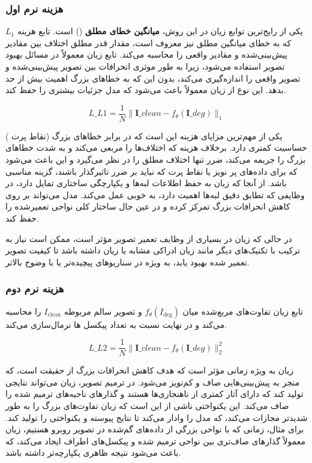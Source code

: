 \subsubsection{هزینه نرم اول}
یکی از رایج‌ترین توابع زیان در این روش، \textbf{میانگین خطای مطلق}
()
است. تابع هزینه $L_1$ که به خطای میانگین مطلق
نیز معروف است، مقدار قدر مطلق اختلاف بین مقادیر پیش‌بینی‌شده و مقادیر واقعی را محاسبه می‌کند. تابع زیان  معمولاً در مسائل بهبود تصویر استفاده می‌شود، زیرا به طور موثری انحرافات بین تصویر پیش‌بینی‌شده و تصویر واقعی را اندازه‌گیری می‌کند، بدون این که به خطاهای بزرگ اهمیت بیش از حد بدهد. این نوع از زیان معمولاً باعث می‌شود که مدل جزئیات بیشتری را حفظ کند.

$$ L\_{L1} = \frac{1}{N} \|\mathbf{I}\_{clean} - f_{\theta}(\mathbf{I}\_{deg}) \| _1 $$  

 یکی از مهم‌ترین مزایای هزینه  این است که در برابر خطاهای بزرگ (نقاط پرت
 )
حساسیت کمتری دارد. برخلاف هزینه  که اختلاف‌ها را مربعی می‌کند و به شدت خطاهای بزرگ را جریمه می‌کند، ضرر  تنها اختلاف مطلق را در نظر می‌گیرد و این باعث می‌شود که برای داده‌های پر نویز یا نقاط پرت که نباید بر ضرر تاثیرگذار باشند، گزینه مناسبی باشد. از آنجا که زیان  به حفظ اطلاعات لبه‌ها و یکپارچگی ساختاری تمایل دارد، در وظایفی که تطابق دقیق لبه‌ها اهمیت دارد، به خوبی عمل می‌کند. مدل می‌تواند بر روی کاهش انحرافات بزرگ تمرکز کرده و در عین حال ساختار کلی نواحی تعمیرشده را حفظ کند.

در حالی که زیان  در بسیاری از وظایف تعمیر تصویر مؤثر است، ممکن است نیاز به ترکیب با تکنیک‌های دیگر مانند زیان ادراکی
مشابه 
\cite{johnsonPerceptualLossesRealTime2016}
 یا زیان  داشته باشد تا کیفیت تصویر تعمیر شده بهبود یابد، به ویژه در سناریوهای پیچیده‌تر یا با وضوح بالاتر.
 \subsubsection{هزینه نرم دوم}
تابع زیان  تفاوت‌های مربع‌شده میان $f_{\theta}(I_{\text{deg}})$ و تصویر سالم مربوطه $I_{\text{clean}}$ را محاسبه می‌کند و در نهایت نسبت به تعداد پیکسل ها نرمال‌سازی می‌کند. 
 
$$ L\_{L2} = \frac{1}{N} \|\mathbf{I}\_{clean} -f_{\theta}(\mathbf{I}\_{deg}) \| _2^2 $$  
 
 زیان  به ویژه زمانی مؤثر است که هدف کاهش انحرافات بزرگ از حقیقت است، که منجر به پیش‌بینی‌هایی صاف و کم‌نویز می‌شود. در ترمیم تصویر، زیان  می‌تواند نتایجی تولید کند که دارای آثار کمتری از ناهنجاری‌ها هستند و گذارهای ناحیه‌های ترمیم شده را صاف می‌کند. این یکنواختی ناشی از این است که زیان  تفاوت‌های بزرگ را به طور شدیدتر مجازات می‌کند، که مدل را وادار می‌کند تا نتایج پیوسته و یکنواختی را تولید کند. برای مثال، زمانی که با نواحی بزرگی از داده‌های گم‌شده در تصویر روبرو هستیم، زیان  معمولاً گذارهای صاف‌تری بین نواحی ترمیم شده و پیکسل‌های اطراف ایجاد می‌کند، که باعث می‌شود نتیجه ظاهری یکپارچه‌تر داشته باشد.
 
